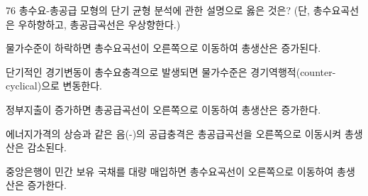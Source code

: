 \begin{question}{76}
총수요-총공급 모형의 단기 균형 분석에 관한 설명으로 옳은 것은? (단, 총수요곡선은 우하향하고, 총공급곡선은 우상향한다.)
\begin{choices}
  \item 물가수준이 하락하면 총수요곡선이 오른쪽으로 이동하여 총생산은 증가된다.
  \item 단기적인 경기변동이 총수요충격으로 발생되면 물가수준은 경기역행적(counter-cyclical)으로 변동한다.
  \item 정부지출이 증가하면 총공급곡선이 오른쪽으로 이동하여 총생산은 증가한다.
  \item 에너지가격의 상승과 같은 음(-)의 공급충격은 총공급곡선을 오른쪽으로 이동시켜 총생산은 감소된다.
  \item 중앙은행이 민간 보유 국채를 대량 매입하면 총수요곡선이 오른쪽으로 이동하여 총생산은 증가한다.
\end{choices}
\end{question}
